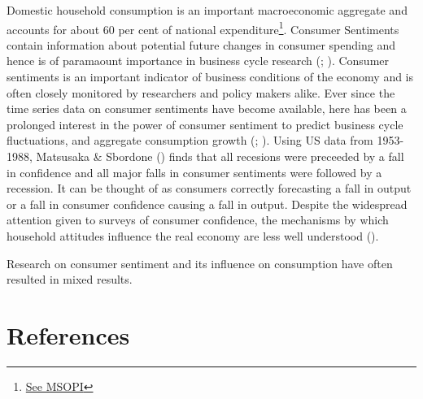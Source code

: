 \documentclass[
  12pt,
  a4paper,
  abstract]{scrartcl}
\begin{document}
Domestic household consumption is an important macroeconomic aggregate
and accounts for about 60 per cent of national expenditure\footnote{\href{https://pib.gov.in/PressReleasePage.aspx?PRID=2010223}{See
  MSOPI}}. Consumer Sentiments contain information about potential
future changes in consumer spending and hence is of paramaount
importance in business cycle research
(;
). Consumer sentiments is an
important indicator of business conditions of the economy and is often
closely monitored by researchers and policy makers alike. Ever since the
time series data on consumer sentiments have become available, here has
been a prolonged interest in the power of consumer sentiment to predict
business cycle fluctuations, and aggregate consumption growth
(;
). Using US
data from 1953-1988, Matsusaka \& Sbordone
() finds that all recesions
were preceeded by a fall in confidence and all major falls in consumer
sentiments were followed by a recession. It can be thought of as
consumers correctly forecasting a fall in output or a fall in consumer
confidence causing a fall in output. Despite the widespread attention
given to surveys of consumer confidence, the mechanisms by which
household attitudes influence the real economy are less well understood
().

Research on consumer sentiment and its influence on consumption have
often resulted in mixed results.

\section*{References}\label{references}
\end{document}
